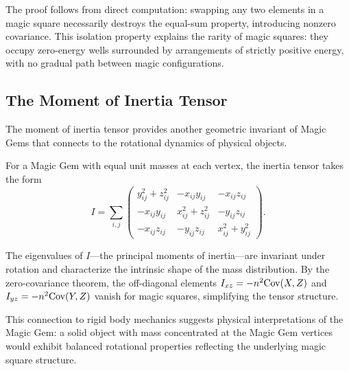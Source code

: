 The proof follows from direct computation: swapping any two elements in a magic square 
necessarily destroys the equal-sum property, introducing nonzero covariance.
This isolation property explains the rarity of magic squares:
they occupy zero-energy wells surrounded by arrangements of strictly positive energy,
with no gradual path between magic configurations.

\subsection{The Moment of Inertia Tensor}
\label{sec:inertia}

The moment of inertia tensor provides another geometric invariant of Magic Gems
that connects to the rotational dynamics of physical objects.

For a Magic Gem with equal unit masses at each vertex, the inertia tensor takes the form
\[
I = \sum_{i,j} \begin{pmatrix}
y_{ij}^2 + z_{ij}^2 & -x_{ij}y_{ij} & -x_{ij}z_{ij} \\
-x_{ij}y_{ij} & x_{ij}^2 + z_{ij}^2 & -y_{ij}z_{ij} \\
-x_{ij}z_{ij} & -y_{ij}z_{ij} & x_{ij}^2 + y_{ij}^2
\end{pmatrix}.
\]

The eigenvalues of $I$---the principal moments of inertia---are invariant under rotation
and characterize the intrinsic shape of the mass distribution.
By the zero-covariance theorem, the off-diagonal elements $I_{xz} = -n^2 \mathrm{Cov}(X,Z)$ and $I_{yz} = -n^2 \mathrm{Cov}(Y,Z)$ 
vanish for magic squares, simplifying the tensor structure.

This connection to rigid body mechanics suggests physical interpretations of the Magic Gem:
a solid object with mass concentrated at the Magic Gem vertices would exhibit balanced rotational properties
reflecting the underlying magic square structure.
